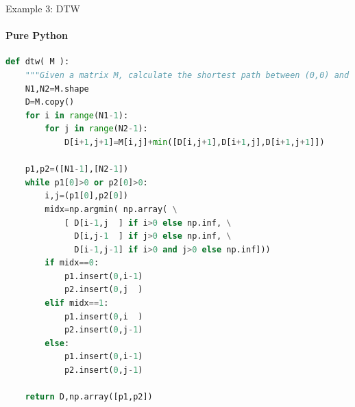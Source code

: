 \documentclass[german]{beamer}
\begin{document}
\begin{frame}[fragile]{Example 3: DTW}
\framesubtitle{Pure Python}
\begin{lstlisting}[language=Python,basicstyle=\tiny]
def dtw( M ):
    """Given a matrix M, calculate the shortest path between (0,0) and (N1,N2)"""
    N1,N2=M.shape
    D=M.copy()
    for i in range(N1-1):
        for j in range(N2-1):
            D[i+1,j+1]=M[i,j]+min([D[i,j+1],D[i+1,j],D[i+1,j+1]])

    p1,p2=([N1-1],[N2-1])
    while p1[0]>0 or p2[0]>0:
        i,j=(p1[0],p2[0]) 
        midx=np.argmin( np.array( \
            [ D[i-1,j  ] if i>0 else np.inf, \
              D[i,j-1  ] if j>0 else np.inf, \
              D[i-1,j-1] if i>0 and j>0 else np.inf]))
        if midx==0:
            p1.insert(0,i-1)
            p2.insert(0,j  )
        elif midx==1:
            p1.insert(0,i  )
            p2.insert(0,j-1)
        else:
            p1.insert(0,i-1)
            p2.insert(0,j-1)
            
    return D,np.array([p1,p2])
\end{lstlisting}
\end{frame}
\end{document}
